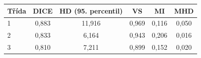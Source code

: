 \begin{tabular}{l c c c c c}
 \hline
Třída & DICE & HD (95. percentil) & VS & MI & MHD \\ \hline
1 & 0,883 & 11,916 & 0,969 & 0,116 & 0,050 \\
2 & 0,833 & 6,164 & 0,943 & 0,206 & 0,016 \\
3 & 0,810 & 7,211 & 0,899 & 0,152 & 0,020 \\
\hline 
 \end{tabular}
